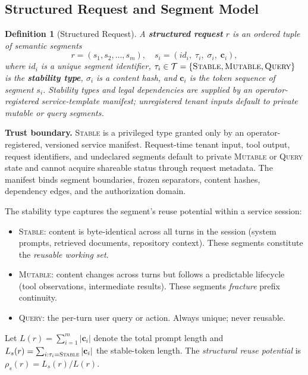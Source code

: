\documentclass[journal]{IEEEtran}
\newtheorem{definition}{Definition}
\begin{document}
\subsection{Structured Request and Segment Model}

\begin{definition}[Structured Request]
A \textbf{structured request} $r$ is an ordered tuple of \emph{semantic segments}
\begin{equation}
  r = (s_1, s_2, \ldots, s_m), \quad s_i = (\textit{id}_i,\; \tau_i,\; \sigma_i,\; \mathbf{c}_i),
\end{equation}
where $\textit{id}_i$ is a unique segment identifier, $\tau_i \in \mathcal{T} = \{\textsc{Stable}, \textsc{Mutable}, \textsc{Query}\}$ is the \textbf{stability type}, $\sigma_i$ is a content hash, and $\mathbf{c}_i$ is the token sequence of segment $s_i$. Stability types and legal dependencies are supplied by an operator-registered service-template manifest; unregistered tenant inputs default to private mutable or query segments.
\end{definition}

\noindent\textbf{Trust boundary.} \textsc{Stable} is a privileged type granted only by an operator-registered, versioned service manifest. Request-time tenant input, tool output, request identifiers, and undeclared segments default to private \textsc{Mutable} or \textsc{Query} state and cannot acquire shareable status through request metadata. The manifest binds segment boundaries, frozen separators, content hashes, dependency edges, and the authorization domain.

The stability type captures the segment's reuse potential within a service session:
\begin{itemize}
  \item \textsc{Stable}: content is byte-identical across all turns in the session (system prompts, retrieved documents, repository context). These segments constitute the \emph{reusable working set}.
  \item \textsc{Mutable}: content changes across turns but follows a predictable lifecycle (tool observations, intermediate results). These segments \emph{fracture} prefix continuity.
  \item \textsc{Query}: the per-turn user query or action. Always unique; never reusable.
\end{itemize}

\noindent Let $L(r) = \sum_{i=1}^{m} |\mathbf{c}_i|$ denote the total prompt length and $L_s(r) = \sum_{i:\tau_i = \textsc{Stable}} |\mathbf{c}_i|$ the stable-token length. The \emph{structural reuse potential} is $\rho_s(r) = L_s(r) / L(r)$.
\end{document}
